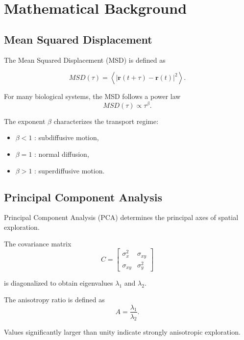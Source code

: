 \documentclass[11pt,a4paper]{article}
\begin{document}
\section{Mathematical Background}

\subsection{Mean Squared Displacement}

The Mean Squared Displacement (MSD) is defined as

\begin{equation}
MSD(\tau)=
\left<
|\mathbf r(t+\tau)-\mathbf r(t)|^2
\right>.
\end{equation}

For many biological systems, the MSD follows a power law
\begin{equation}
MSD(\tau)\propto\tau^\beta.
\end{equation}

The exponent $\beta$ characterizes the transport regime:

\begin{itemize}
\item $\beta<1$ : subdiffusive motion,
\item $\beta=1$ : normal diffusion,
\item $\beta>1$ : superdiffusive motion.
\end{itemize}

\subsection{Principal Component Analysis}

Principal Component Analysis (PCA) determines the principal axes of spatial exploration.

The covariance matrix
\begin{equation}
C= \begin{bmatrix}
\sigma_x^2 & \sigma_{xy}\\
\sigma_{xy} & \sigma_y^2
\end{bmatrix}
\end{equation}

is diagonalized to obtain eigenvalues $\lambda_1$ and $\lambda_2$.

The anisotropy ratio is defined as
\begin{equation}
A=\frac{\lambda_1}{\lambda_2}.
\end{equation}

Values significantly larger than unity indicate strongly anisotropic exploration.
\end{document}
